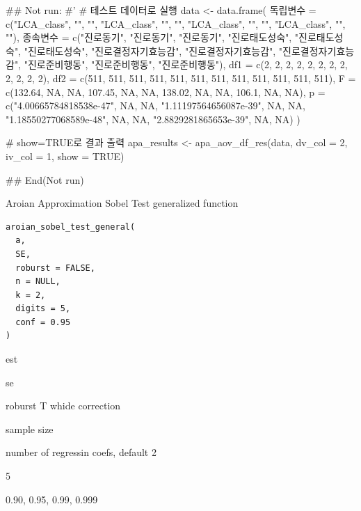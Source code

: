 \documentclass[a4paper]{book}
\begin{document}
\begin{Examples}
\begin{ExampleCode}
\#\# Not run: 
#'
# 테스트 데이터로 실행
data <- data.frame(
  독립변수 = c("LCA_class", "", "", "LCA_class",
  "", "", "LCA_class", "", "", "LCA_class", "", ""),
  종속변수 = c("진로동기", "진로동기", "진로동기",
  "진로태도성숙", "진로태도성숙", "진로태도성숙",
  "진로결정자기효능감", "진로결정자기효능감", "진로결정자기효능감",
  "진로준비행동", "진로준비행동", "진로준비행동"),
  df1 = c(2, 2, 2, 2, 2, 2, 2, 2, 2, 2, 2, 2),
  df2 = c(511, 511, 511, 511, 511, 511,
   511, 511, 511, 511, 511, 511),
  F = c(132.64, NA, NA, 107.45, NA, NA,
   138.02, NA, NA, 106.1, NA, NA),
  p = c("4.00665784818538e-47", NA, NA,
   "1.11197564656087e-39", NA, NA,
   "1.18550277068589e-48", NA, NA,
   "2.8829281865653e-39", NA, NA)
)

# show=TRUE로 결과 출력
apa_results <- apa_aov_df_res(data, dv_col = 2, iv_col = 1, show = TRUE)


## End(Not run)
\end{ExampleCode}
\end{Examples}
%
\begin{Description}
Aroian Approximation Sobel Test generalized function
\end{Description}
%
\begin{Usage}
\begin{verbatim}
aroian_sobel_test_general(
  a,
  SE,
  roburst = FALSE,
  n = NULL,
  k = 2,
  digits = 5,
  conf = 0.95
)
\end{verbatim}
\end{Usage}
%
\begin{Arguments}
\begin{ldescription}
\item[\code{a}] est

\item[\code{SE}] se

\item[\code{roburst}] roburst T whide correction

\item[\code{n}] sample size

\item[\code{k}] number of regressin coefs, default 2

\item[\code{digits}] 5

\item[\code{conf}] 0.90, 0.95, 0.99, 0.999
\end{ldescription}
\end{Arguments}
\end{document}
